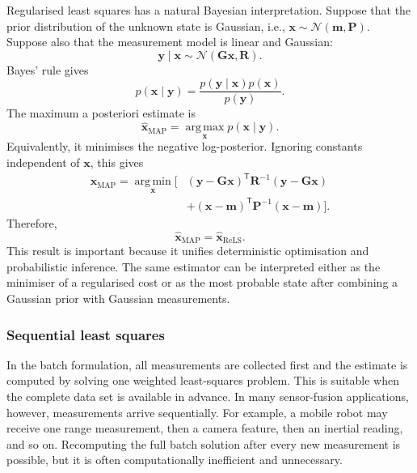 \documentclass{ieeeaccess}
\begin{document}
Regularised least squares has a natural Bayesian interpretation. Suppose that the prior distribution of the unknown state is Gaussian, i.e., $\mathbf{x}
\sim
\mathcal{N}
\left(
\mathbf{m},
\mathbf{P}
\right)$. Suppose also that the measurement model is linear and Gaussian:
\begin{equation}
\mathbf{y}\mid\mathbf{x}
\sim
\mathcal{N}
\left(
\mathbf{G}\mathbf{x},
\mathbf{R}
\right).
\end{equation}
Bayes' rule gives
\begin{equation}
p(\mathbf{x}\mid\mathbf{y})
=
\frac{
p(\mathbf{y}\mid\mathbf{x})p(\mathbf{x})
}{
p(\mathbf{y})
}.
\end{equation}
The maximum a posteriori estimate is
\begin{equation}
\widehat{\mathbf{x}}_{\mathrm{MAP}}
=
\operatorname*{arg\,max}_{\mathbf{x}}
p(\mathbf{x}\mid\mathbf{y}).
\end{equation}
Equivalently, it minimises the negative log-posterior. Ignoring constants independent of $\mathbf{x}$, this gives
\begin{align}
\widehat{\mathbf{x}}_{\mathrm{MAP}}
=
\operatorname*{arg\,min}_{\mathbf{x}}
\bigg[
&\left(
\mathbf{y}
-
\mathbf{G}\mathbf{x}
\right)^{\mathsf T}
\mathbf{R}^{-1}
\left(
\mathbf{y}
-
\mathbf{G}\mathbf{x}
\right) \nonumber \\
&+
\left(
\mathbf{x}
-
\mathbf{m}
\right)^{\mathsf T}
\mathbf{P}^{-1}
\left(
\mathbf{x}
-
\mathbf{m}
\right)
\bigg].
\end{align}
Therefore,
\begin{equation}
\widehat{\mathbf{x}}_{\mathrm{MAP}}
=
\widehat{\mathbf{x}}_{\mathrm{ReLS}}.
\end{equation}
This result is important because it unifies deterministic optimisation and probabilistic inference. The same estimator can be interpreted either as the minimiser of a regularised cost or as the most probable state after combining a Gaussian prior with Gaussian measurements.

\subsubsection{Sequential least squares}

In the batch formulation, all measurements are collected first and the estimate is computed by solving one weighted least-squares problem. This is suitable when the complete data set is available in advance. In many sensor-fusion applications, however, measurements arrive sequentially. For example, a mobile robot may receive one range measurement, then a camera feature, then an inertial reading, and so on. Recomputing the full batch solution after every new measurement is possible, but it is often computationally inefficient and unnecessary.
\end{document}
